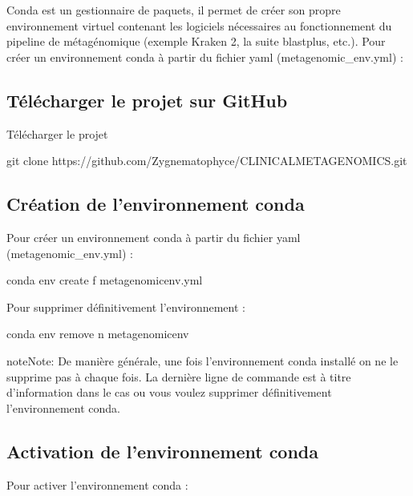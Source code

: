 \documentclass[letterpaper,10pt,french]{sphinxmanual}
\begin{document}
Conda est un gestionnaire de paquets, il permet de créer son propre environnement virtuel contenant les logiciels nécessaires au fonctionnement du pipeline de métagénomique (exemple Kraken 2, la suite blast\sphinxhyphen{}plus, etc.). Pour créer un environnement conda à partir du fichier yaml (metagenomic\_env.yml) :


\subsection{Télécharger le projet sur GitHub}
\label{\detokenize{installation_conda_environnement:telecharger-le-projet-sur-github}}
Télécharger le projet

\begin{sphinxVerbatim}[commandchars=\\\{\}]
git clone https://github.com/Zygnematophyce/CLINICAL\PYGZus{}METAGENOMICS.git
\end{sphinxVerbatim}


\subsection{Création de l’environnement conda}
\label{\detokenize{installation_conda_environnement:creation-de-l-environnement-conda}}
Pour créer un environnement conda à partir du fichier yaml (metagenomic\_env.yml) :

\begin{sphinxVerbatim}[commandchars=\\\{\}]
conda env create \PYGZhy{}f metagenomic\PYGZus{}env.yml
\end{sphinxVerbatim}

Pour supprimer définitivement l’environnement :

\begin{sphinxVerbatim}[commandchars=\\\{\}]
conda env remove \PYGZhy{}n metagenomic\PYGZus{}env
\end{sphinxVerbatim}

\begin{sphinxadmonition}{note}{Note:}
De manière générale, une fois l’environnement conda installé on ne le supprime pas à chaque fois. La dernière ligne de commande est à titre d’information dans le cas ou vous voulez supprimer définitivement l’environnement conda.
\end{sphinxadmonition}


\subsection{Activation de l’environnement conda}
\label{\detokenize{installation_conda_environnement:activation-de-l-environnement-conda}}
Pour activer l’environnement conda :
\end{document}
